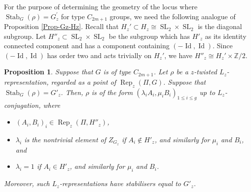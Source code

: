 \documentclass[11pt,oneside,dvipsnames]{amsart}
\theoremstyle{plain}
\newtheorem{Prop}[Thm]{Proposition}
\theoremstyle{definition}
\theoremstyle{named}
\DeclareMathOperator{\Id}{Id}
\DeclareMathOperator{\Rep}{Rep}
\DeclareMathOperator{\SL}{SL}
\DeclareMathOperator{\Stab}{Stab}
\begin{document}
For the purpose of determining the geometry of the locus where $\Stab_G(\rho)=G_z^{\prime}$ for type $C_{2m+1}$ groups, we need the following analogue of Proposition \ref{Prop-Gz-Hz}. Recall that $H_z'\subset H_z\cong\SL_2\times\SL_2$ is the diagonal subgroup. Let $H''_z\subset\SL_2\times\SL_2$ be the subgroup which has $H'_z$ as its identity connected component and has a component containing $(-\Id,\Id)$. Since $(-\Id,\Id)$ has order two and acts trivially on $H_z'$, we have $H''_z\cong H_z'\times\mathbb{Z}/2$.
\begin{Prop}\label{Prop-G'z-H'z}
Suppose that $G$ is of type $C_{2m+1}$. Let $\rho$ be a $z$-twisted $L_z$-representation, regarded as a point of $\Rep_z(\Pi,G)$. Suppose that $\Stab_G(\rho)=G'_z$. Then, $\rho$ is of the form $(\lambda_iA_i,\mu_iB_i)_{1\le i\le g}$ up to $L_z$-conjugation, where
\begin{itemize}
\item $(A_i,B_i)_i\in\Rep_z(\Pi,H''_z)$,
\item $\lambda_i$ is the nontrivial element of $Z_{G_z}$ if $A_i\notin H'_z$, and similarly for $\mu_i$ and $B_i$, and
\item $\lambda_i=1$ if $A_i\in H'_z$, and similarly for $\mu_i$ and $B_i$. 
\end{itemize}
Moreover, such $L_z$-representations have stabilisers equal to $G'_z$.
\end{Prop} 
\end{document}
